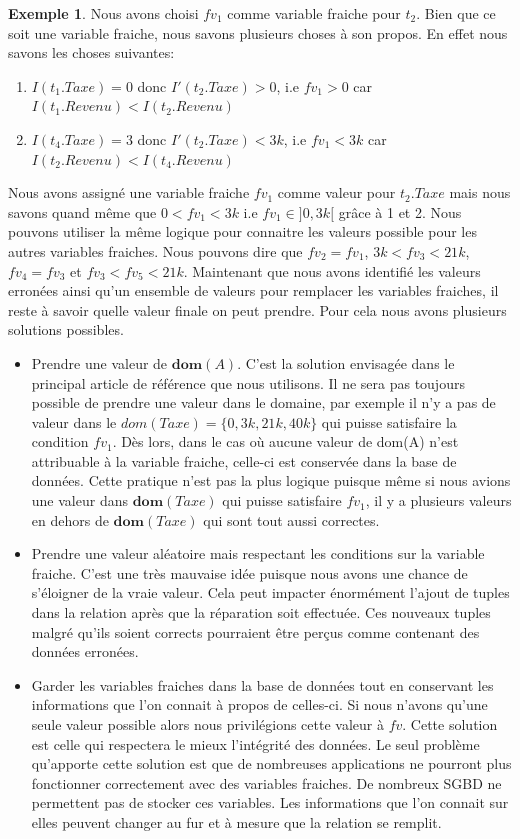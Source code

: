 \documentclass[letterpaper, 12pt]{report}
\theoremstyle{definition}
\newtheorem{myexample}{Exemple}
\newcommand{\dom}{\mathbf{dom}}
\begin{document}
\begin{myexample}
Nous avons choisi $fv_1$ comme variable fraiche pour $t_2$. Bien que ce soit une variable fraiche, nous savons plusieurs choses à son propos. En effet nous savons les choses suivantes:
\begin{enumerate}

\item $I(t_1.Taxe)=0$ donc $I'(t_2.Taxe)>0$, i.e $fv_1>0$ car $I(t_1.Revenu)<I(t_2.Revenu)$
\item $I(t_4.Taxe)=3$ donc $I'(t_2.Taxe)<3k$, i.e $fv_1<3k$ car $I(t_2.Revenu)<I(t_4.Revenu)$

\end{enumerate}

Nous avons assigné une variable fraiche $fv_1$ comme valeur pour $t_2.Taxe$ mais nous savons quand même que $0<fv_1<3k$ i.e $fv_1 \in ]0,3k[$ grâce à 1 et 2. Nous pouvons utiliser la même logique pour connaitre les valeurs possible pour les autres variables fraiches. Nous pouvons dire que $fv_2 = fv_1$, $3k<fv_3<21k$, $fv_4 = fv_3$ et $fv_3<fv_5<21k$. Maintenant que nous avons identifié les valeurs erronées ainsi qu'un ensemble de valeurs pour remplacer les variables fraiches, il reste à savoir quelle valeur finale on peut prendre. Pour cela nous avons plusieurs solutions possibles.\\
\end{myexample}
\begin{itemize}
	\item Prendre une valeur de $\dom(A)$. C'est la solution envisagée dans le principal article de référence que nous utilisons. Il ne sera pas toujours possible de prendre une valeur dans le domaine, par exemple il n'y a pas de valeur dans le $dom(Taxe)= \{0,3k,21k,40k\}$ qui puisse satisfaire la condition $fv_1$. Dès lors, dans le cas où aucune valeur de dom(A) n'est attribuable à la variable fraiche, celle-ci est conservée dans la base de données. Cette pratique n'est pas la plus logique puisque même si nous avions une valeur dans $\dom(Taxe)$ qui puisse satisfaire $fv_1$, il y a plusieurs valeurs en dehors de $\dom(Taxe)$ qui sont tout aussi correctes.
	\item Prendre une valeur aléatoire mais respectant les conditions sur la variable fraiche. C'est une très mauvaise idée puisque nous avons une chance de s'éloigner de la vraie valeur. Cela peut impacter énormément l'ajout de tuples dans la relation après que la réparation soit effectuée. Ces nouveaux tuples malgré qu'ils soient corrects pourraient être perçus comme contenant des données erronées.
	\item Garder les variables fraiches dans la base de données tout en conservant les informations que l'on connait à propos de celles-ci. Si nous n'avons qu'une seule valeur possible alors nous privilégions cette valeur à $fv$. Cette solution est celle qui respectera le mieux l'intégrité des données. Le seul problème qu'apporte cette solution est que de nombreuses applications ne pourront plus fonctionner correctement avec des variables fraiches. De nombreux SGBD ne permettent pas de stocker ces variables. Les informations que l'on connait sur elles peuvent changer au fur et à mesure que la relation se remplit.
\end{itemize}
\end{document}
